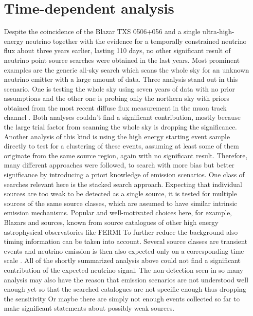 \chapter{Time-dependent analysis}
  \label{chp:time_dep}
Despite the coincidence of the Blazar TXS 0506+056 and a single ultra-high-energy neutrino together with the evidence for a temporally constrained neutrino flux about three years earlier, lasting 110 days, no other significant result of neutrino point source searches were obtained in the last years.
Most prominent examples are the generic all-sky search which scans the whole sky for an unknown neutrino emitter with a large amount of data.
Three analysis stand out in this scenario.
One is testing the whole sky using seven years of data with no prior assumptions \cite{Aartsen:2016oji} and the other one is probing only the northern sky with priors obtained from the most recent diffuse flux measurement in the muon track channel \cite{Haack:2017dxi,Reimann:2017owh}.
Both analyses couldn't find a significant contribution, mostly because the large trial factor from scanning the whole sky is dropping the significance.
Another analysis of this kind is using the high energy starting event sample directly to test for a clustering of these events, assuming at least some of them originate from the same source region, again with no significant result.
Therefore, many different approaches were followed, to search with more bias but better significance by introducing a priori knowledge of emission scenarios.
One class of searches relevant here is the stacked search approach.
Expecting that individual sources are too weak to be detected as a single source, it is tested for multiple sources of the same source classes, which are assumed to have similar intrinsic emission mechanisms.
Popular and well-motivated choices here, for example, Blazars and sources, known from source catalogues of other high energy astrophysical observatories like FERMI \cite{Aartsen:2017zvw,Aartsen:2017wea,Aartsen:2016lir,Aartsen:2017ujz}
To further reduce the background also timing information can be taken into account.
Several source classes are transient events and neutrino emission is then also expected only on a corresponding time scale \cite{Bianco:2007fe,Komossa:2015qya,Katz:2016dti}.
All of the shortly summarized analysis above could not find a significant contribution of the expected neutrino signal.
The non-detection seen in so many analysis may also have the reason that emission scenarios are not understood well enough yet so that the searched catalogues are not specific enough thus dropping the sensitivity Or maybe there are simply not enough events collected so far to make significant statements about possibly weak sources.

